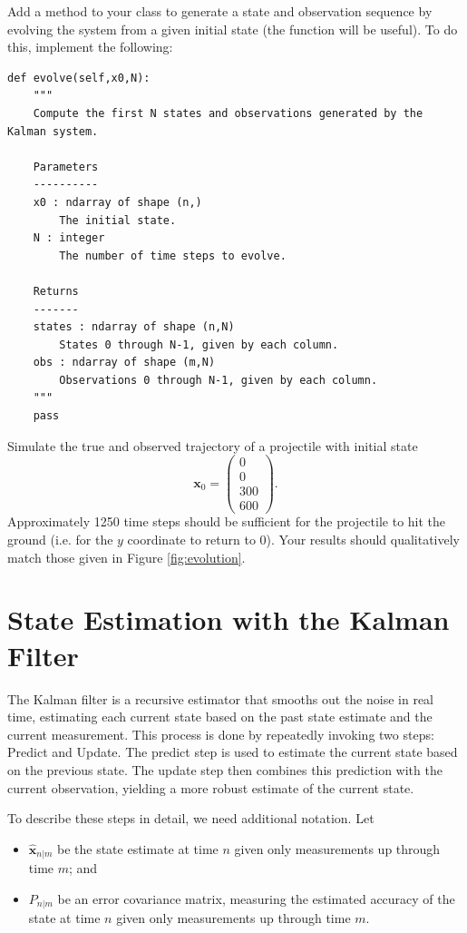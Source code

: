 \begin{problem}
Add a method to your  class to generate a state and observation sequence by evolving the system from a given initial state (the function  will be useful).
To do this, implement the following:
\begin{lstlisting}
def evolve(self,x0,N):
    """
    Compute the first N states and observations generated by the Kalman system.

    Parameters
    ----------
    x0 : ndarray of shape (n,)
        The initial state.
    N : integer
        The number of time steps to evolve.

    Returns
    -------
    states : ndarray of shape (n,N)
        States 0 through N-1, given by each column.
    obs : ndarray of shape (m,N)
        Observations 0 through N-1, given by each column.
    """
    pass
\end{lstlisting}

Simulate the true and observed trajectory of a projectile with initial state
\[
\mathbf{x}_0 = \left( \begin{array}{c} 0\\ 0 \\ 300 \\ 600\end{array} \right).
\]
Approximately 1250 time steps should be sufficient for the projectile to hit the ground (i.e. for the $y$ coordinate to return to 0).
Your results should qualitatively match those given in Figure \ref{fig:evolution}.
\label{prob:simulation}
\end{problem}



\section*{State Estimation with the Kalman Filter}
The Kalman filter is a recursive estimator that smooths out the noise in real time, estimating each current state based on the past state estimate and the current measurement.
This process is done by repeatedly invoking two steps: Predict and Update.
The predict step is used to estimate the current state based on the previous state.
The update step then combines this prediction with the current observation, yielding a more robust estimate of the current state.

To describe these steps in detail, we need additional notation. Let
\begin{itemize}
	\item $\widehat{\mathbf{x}}_{n|m}$ be the state estimate at time $n$ given only measurements up through time $m$; and
	\item $P_{n|m}$ be an error covariance matrix, measuring the estimated accuracy of the state at time $n$ given only measurements up through time $m$.
\end{itemize}

